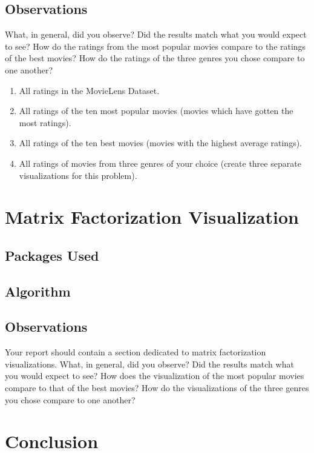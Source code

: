 \subsection{Observations}
What, in general, did you observe? Did the results match what you would expect to see? How do the ratings from the most popular movies compare to the ratings of the best movies? How do the ratings of the three genres you chose compare to one another?
\begin{enumerate}
    \item All ratings in the MovieLens Dataset.
    \item All ratings of the ten most popular movies (movies which have gotten the most ratings).
    \item All ratings of the ten best movies (movies with the highest average ratings).
    \item All ratings of movies from three genres of your choice (create three separate visualizations for this problem).
\end{enumerate}



\section{Matrix Factorization Visualization}

\subsection{Packages Used}

\subsection{Algorithm}

\subsection{Observations}
Your report should contain a section dedicated to matrix factorization visualizations. What, in general, did you observe? Did the results match what you would expect to see? How does the visualization of the most popular movies compare to that of the best movies? How do the visualizations of the three genres you chose compare to one another?



\section{Conclusion}
